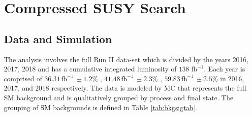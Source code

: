 
\setcounter{secnumdepth}{3}
\setcounter{tocdepth}{3}
\setlength{\parskip}{\smallskipamount}
\setlength{\parindent}{0pt}


\makeatletter


\providecommand{\tabularnewline}{\\}


\makeatother

%

\chapter{Compressed SUSY Search}


\section{ Data and Simulation}
The analysis involves the full Run II data-set which is divided by the years 2016, 2017, 2018 and has a cumulative integrated luminosity of $138 \, \, \text{fb}^{-1}$. Each year is comprised of $36.31 \, \text{fb}^{-1} \, \pm 1.2\%$ \cite{CMS:2021xjt}, $41.48 \, \text{fb}^{-1} \, \pm 2.3\%$ \cite{CMS:2018elu}, $59.83 \, \text{fb}^{-1} \, \pm2.5\%$ \cite{CMS:2019jhq} in 2016, 2017, and 2018 respectively. The data is modeled by MC that represents the full SM background and is qualitatively grouped by process and final state. The grouping of SM backgrounds is defined in Table \ref{tab:bkgsigtab}.

